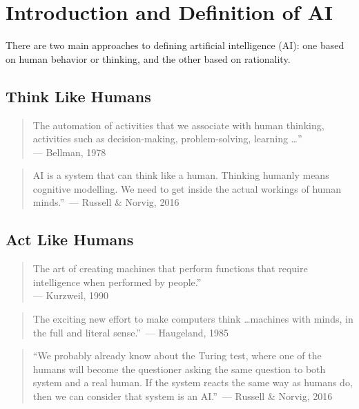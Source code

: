 \section{Introduction and Definition of AI}
\label{sec:intro-def-ai}
There are two main approaches to defining artificial intelligence (AI): one based on human behavior or thinking, and the other based on rationality.

\subsection*{Think Like Humans}
\label{ssec:think-like-humans-def-ai}
\begin{quote}
The automation of activities that we associate with human thinking, activities such as decision-making, problem-solving, learning \ldots''\\ \hspace*{\fill}--- Bellman, 1978 \end{quote} \begin{quote} AI is a system that can think like a human. Thinking humanly means cognitive modelling. We need to get inside the actual workings of human minds.''\
\hspace*{\fill}--- Russell & Norvig, 2016
\end{quote}

\subsection*{Act Like Humans}
\label{ssec:act-like-humans-def-ai}
\begin{quote}
The art of creating machines that perform functions that require intelligence when performed by people.''\\ \hspace*{\fill}--- Kurzweil, 1990 \end{quote} \begin{quote} The exciting new effort to make computers think \ldots machines with minds, in the full and literal sense.''\
\hspace*{\fill}--- Haugeland, 1985
\end{quote}
\begin{quote}
``We probably already know about the Turing test, where one of the humans will become the questioner asking the same question to both system and a real human. If the system reacts the same way as humans do, then we can consider that system is an AI.''\
\hspace*{\fill}--- Russell & Norvig, 2016
\end{quote}


